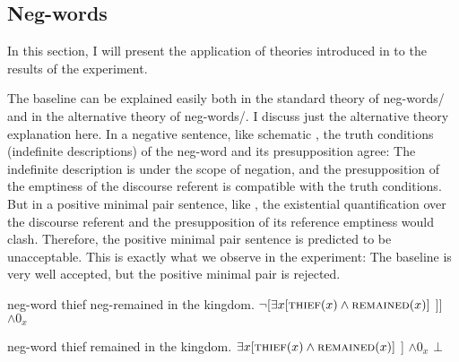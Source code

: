 \documentclass[output=paper,colorlinks,citecolor=brown]{langscibook}
\begin{document}
\subsection{Neg-words}\label{sec:neg-words}

In this section, I will present the application of theories introduced in  to the results of the experiment.

The baseline can be explained easily both in the standard theory of neg-words/ \citet{zeijlstra2004sentential} and in the alternative theory of neg-words/\citet{ovalle2004double}. I discuss just the alternative theory explanation here. In a negative sentence, like schematic , the truth conditions (indefinite descriptions) of the neg-word and its presupposition agree: The indefinite description is under the scope of negation, and the presupposition of the emptiness of the discourse referent is compatible with the truth conditions. But in a positive minimal pair sentence, like , the existential quantification over the discourse referent and the presupposition of its reference emptiness would clash. Therefore, the positive minimal pair sentence is predicted to be unacceptable. This is exactly what we observe in the experiment: The baseline is very well accepted, but the positive minimal pair is rejected.

\ea\label{ex-14} neg-word thief neg-remained in the kingdom. \ea {[}$\neg[\exists x[\textsc{thief}(x) \wedge \textsc{remained}(x)]$ {]}{]} $\wedge 0_x$\z\z

\ea\label{ex-15} neg-word thief remained in the kingdom. \ea {[}$\exists x[\textsc{thief}(x) \wedge \textsc{remained}(x)]$ {]} $\wedge 0_x$ \hfill $\bot$\z\z
\end{document}
